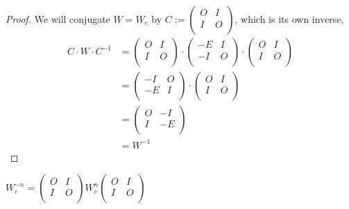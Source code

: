 \begin{proof}
  We will conjugate $W=W_{c}$ by
  $C := \left(\begin{smallmatrix} O & I \\ I & O \\\end{smallmatrix}\right)$,
  which is its own inverse,
  \[
  \begin{aligned}
  C \cdot W \cdot C^{-1}
  & =
  \left(
  \begin{array}{cc}
    O & I \\
    I & O \\
  \end{array}
  \right)
  \cdot
  \left(
  \begin{array}{cc}
    -E & I \\
    -I & O \\
  \end{array}
  \right)
  \cdot
  \left(
  \begin{array}{cc}
    O & I \\
    I & O \\
  \end{array}
  \right) \\
  & =
  \left(
  \begin{array}{cc}
    -I & O \\
    -E & I \\
  \end{array}
  \right)
  \cdot
  \left(
  \begin{array}{cc}
    O & I \\
    I & O \\
  \end{array}
  \right) \\
  & =
  \left(
  \begin{array}{cc}
    O & -I \\
    I & -E \\
  \end{array}
  \right) \\
  & =
  W^{-1}
  \end{aligned}
  \]
\end{proof}

\begin{corollary}
  $W_{c}^{-n} =
  \left(\begin{smallmatrix} O & I \\ I & O \\\end{smallmatrix}\right)
  W_{c}^{n}
  \left(\begin{smallmatrix} O & I \\ I & O \\\end{smallmatrix}\right)$
\end{corollary}

